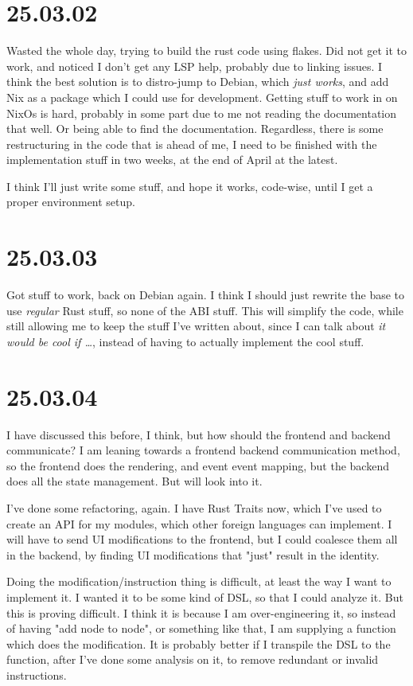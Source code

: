 \section{25.03.02}

Wasted the whole day, trying to build the rust code using flakes. Did not get it
to work, and noticed I don't get any LSP help, probably due to linking issues. I
think the best solution is to distro-jump to Debian, which \textit{just works},
and add Nix as a package which I could use for development. Getting stuff to
work in on NixOs is hard, probably in some part due to me not reading the
documentation that well. Or being able to find the documentation.
Regardless, there is some restructuring in the code that is ahead of me, I need
to be finished with the implementation stuff in two weeks, at the end of April
at the latest.

I think I'll just write some stuff, and hope it works, code-wise, until I get a
proper environment setup.

\section{25.03.03}

Got stuff to work, back on Debian again. I think I should just rewrite the base
to use \textit{regular} Rust stuff, so none of the ABI stuff. This will simplify
the code, while still allowing me to keep the stuff I've written about, since I
can talk about \textit{it would be cool if \dots}, instead of having to actually
implement the cool stuff.

\section{25.03.04}

I have discussed this before, I think, but how should the frontend and backend
communicate? I am leaning towards a frontend \to backend communication method,
so the frontend does the rendering, and event \to event mapping, but the backend
does all the state management. But will look into it.

I've done some refactoring, again. I have Rust Traits now, which I've used to
create an API for my modules, which other foreign languages can implement. I
will have to send UI modifications to the frontend, but I could coalesce them
all in the backend, by finding UI modifications that "just" result in the
identity.

Doing the modification/instruction thing is difficult, at least the way I want
to implement it. I wanted it to be some kind of DSL, so that I could analyze it.
But this is proving difficult. I think it is because I am over-engineering it,
so instead of having "add node to node", or something like that, I am supplying
a function which does the modification. It is probably better if I transpile the
DSL to the function, after I've done some analysis on it, to remove redundant or
invalid instructions.

